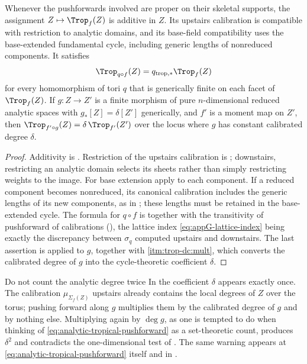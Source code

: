 \begin{proposition}
\label{prop:trop-cycle-additive}
Whenever the pushforwards involved are proper on their skeletal supports,
the assignment $Z\mapsto\Trop_f(Z)$ is additive in $Z$. Its upstairs
calibration is compatible with restriction to analytic domains, and its
base-field compatibility uses the base-extended fundamental cycle,
including generic lengths of nonreduced components. It satisfies
\[
 \Trop_{q\circ f}(Z)=q_{\mathrm{trop},*}\Trop_f(Z)
\]
for every homomorphism of tori $q$ that is generically finite on each facet
of $\Trop_f(Z)$. If $g:Z\to Z'$ is a finite morphism of pure
$n$-dimensional reduced analytic spaces with $g_*[Z]=\delta[Z']$ generically,
and $f'$ is a moment map on $Z'$, then
$\Trop_{f'\circ g}(Z)=\delta\,\Trop_{f'}(Z')$ over the locus where $g$ has
constant calibrated degree $\delta$.
\end{proposition}

\begin{proof}
Additivity is . Restriction of the
upstairs calibration is ; downstairs,
restricting an analytic domain selects its sheets rather than simply
restricting weights to the image. For base extension apply
 to each component. If a reduced
component becomes nonreduced, its canonical calibration includes the
generic lengths of its new components, as in
; these lengths must be retained in the
base-extended cycle. The formula
for $q\circ f$ is  together with the
transitivity of pushforward of calibrations
(), the lattice index
\eqref{eq:appG-lattice-index} being exactly the discrepancy between
$\sigma_q$ computed upstairs and downstairs. The last assertion is
 applied to $g$, together with
 \cref{itm:trop-dc:mult}, which converts
the calibrated degree of $g$ into the cycle-theoretic coefficient $\delta$.
\end{proof}

\begin{warning}{Do not count the analytic degree twice}
In  the coefficient $\delta$ appears exactly
once. The calibration $\mu_{\Sigma_f(Z)}$ upstairs already contains the local
degrees of $Z$ over the torus; pushing forward along $g$ multiplies them by
the calibrated degree of $g$ and by nothing else. Multiplying again by
$\deg g$, as one is tempted to do when thinking of
\eqref{eq:analytic-tropical-pushforward} as a set-theoretic count, produces
$\delta^2$ and contradicts the one-dimensional test of
. The same warning appears at
\eqref{eq:analytic-tropical-pushforward} itself and in
.
\end{warning}

